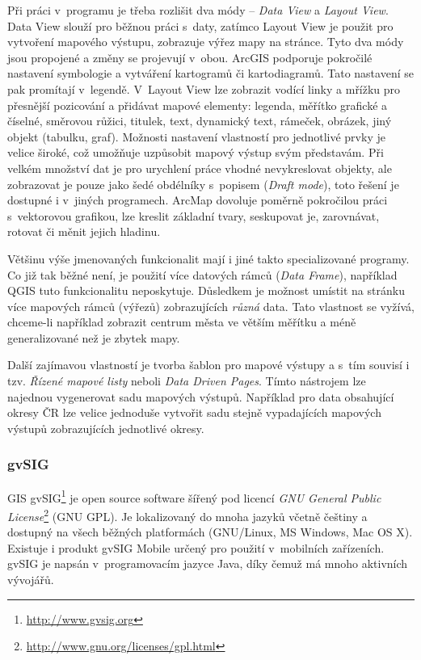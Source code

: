 \documentclass[a4paper,12pt,draft]{article}
\begin{document}
Při práci v~programu je třeba rozlišit dva módy -- \emph{Data View}
a \emph{Layout View}. Data View slouží pro běžnou práci s~daty,
zatímco Layout View je použit pro vytvoření mapového výstupu,
zobrazuje výřez mapy na stránce. Tyto dva módy jsou propojené a
změny se projevují v~obou. ArcGIS podporuje pokročilé nastavení
symbologie a vytváření kartogramů či kartodiagramů. Tato nastavení se
pak promítají v~legendě. V~Layout View lze zobrazit vodící linky a
mřížku pro přesnější pozicování  a  přidávat mapové elementy:
legenda, měřítko grafické a číselné, směrovou růžici, titulek,
text, dynamický text, rámeček, obrázek, jiný objekt (tabulku, graf).
Možnosti nastavení vlastností pro jednotlivé prvky je velice široké,
což umožňuje uzpůsobit mapový výstup svým představám. Při velkém
množství dat je pro urychlení práce vhodné nevykreslovat objekty, ale
zobrazovat je pouze jako šedé obdélníky s~popisem (\emph{Draft mode}),
toto řešení je dostupné i v~jiných programech. ArcMap dovoluje poměrně
pokročilou práci s~vektorovou grafikou, lze kreslit základní tvary,
seskupovat je, zarovnávat, rotovat či měnit jejich hladinu.

Většinu výše jmenovaných funkcionalit mají i jiné takto
specializované programy. Co již tak běžné není, je použití více
datových rámců (\emph{Data Frame}), například QGIS tuto funkcionalitu
neposkytuje. Důsledkem je možnost umístit na stránku více mapových
rámců (výřezů) zobrazujících \emph{různá} data. Tato vlastnost
se vyžívá, chceme-li například zobrazit centrum města ve větším
měřítku a méně generalizované než je zbytek mapy.

Další zajímavou vlastností je tvorba šablon pro mapové výstupy a
s~tím souvisí i tzv. \emph{Řízené mapové listy} neboli \emph{Data
Driven Pages}. Tímto nástrojem lze najednou vygenerovat sadu mapových
výstupů. Například pro data obsahující okresy ČR lze velice jednoduše
vytvořit sadu stejně vypadajících mapových výstupů zobrazujících
jednotlivé okresy.


\subsubsection{gvSIG}
GIS gvSIG\footnote{\url{http://www.gvsig.org}} je open source software šířený
pod licencí \emph{GNU General Public
License}\footnote{\url{http://www.gnu.org/licenses/gpl.html}} (GNU GPL). Je
lokalizovaný do mnoha jazyků včetně češtiny a dostupný na všech
běžných platformách (GNU/Linux, MS Windows, Mac OS X). Existuje i produkt gvSIG
Mobile určený pro použití v~mobilních zařízeních. gvSIG je napsán
v~programovacím jazyce Java, díky čemuž má mnoho aktivních vývojářů.
\end{document}
